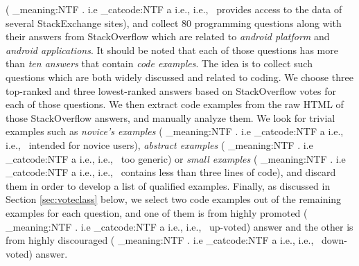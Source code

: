 \documentclass[conference]{IEEEtran}
\makeatletter
\newcommand\latinabbrev[1]{
  \peek_meaning:NTF . {%
    #1\@}%
  { \peek_catcode:NTF a {%
      #1., \@ }%
    {#1., \@}}}
\def\eg{\latinabbrev{e.g}}
\def\ie{\latinabbrev{i.e}}
\makeatother
\begin{document}
(\ie\ provides access to the data of several StackExchange sites), and collect 80 programming questions along with their answers from StackOverflow which are related to \emph{android platform} and \emph{android applications}.
It should be noted that each of those questions has more than \emph{ten answers} that contain \emph{code examples}. The idea is to collect such questions which are both widely discussed and related to coding. 
We choose three top-ranked and three lowest-ranked answers based on StackOverflow votes for each of those questions. We then extract code examples from the raw HTML of those StackOverflow answers, and manually analyze them.
We look for trivial examples such as \emph{novice's examples} (\ie\ intended for novice users), \emph{abstract examples} (\ie\ too generic) or \emph{small examples} (\ie\ contains less than three lines of code), and discard them in order to develop a list of qualified examples. 
Finally, as discussed in Section \ref{sec:voteclass} below, we select two code examples out of the remaining examples for each question, and one of them is from highly promoted (\ie\ up-voted) answer and the other is from highly discouraged (\ie\ down-voted) answer.

\vspace{-.1cm}
\end{document}

